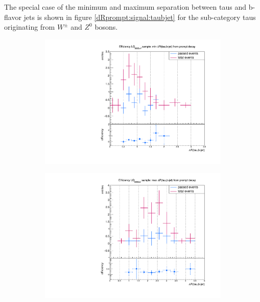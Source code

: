 %
The special case of the minimum and maximum separation between taus and b-flavor jets is shown in figure \ref{dRprompt:signal:taubjet} for the sub-category taus originating from $W^\pm$ and $Z^0$ bosons.
%
\begin{figure}
  \centering
                \begin{subfigure}[t]{0.49\textwidth}
                \includegraphics[width=\textwidth]{figures/plots/LQ75/Divided_mindR_pr_taubjet.pdf}
                \label{dRprompt:signal:taubjet:minLQ75}
                \end{subfigure}
                \begin{subfigure}[t]{0.49\textwidth}
                \includegraphics[width=\textwidth]{figures/plots/LQ75/Divided_maxdR_pr_taubjet.pdf}

\end{subfigure}
\end{figure}
